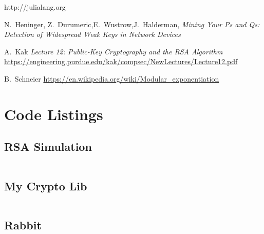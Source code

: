 \documentclass[conference]{/Users/paul/MSEE/ee595/project/report/IEEEtran/IEEEtran}
\begin{document}
%
%
%
\begin{thebibliography}{1}
        http://julialang.org
         
        N.~Heninger, Z.~Durumeric,E.~Wustrow,J.~Halderman, \emph{Mining Your Ps and Qs: Detection of Widespread Weak Keys in Network Devices}

    A.~Kak \emph{Lecture 12: Public-Key Cryptography and the RSA Algorithm}
    \url{https://engineering.purdue.edu/kak/compsec/NewLectures/Lecture12.pdf}
     
        B.~Schneier \url{https://en.wikipedia.org/wiki/Modular_exponentiation}
\end{thebibliography}

\onecolumn
\newpage

\section{Code Listings}
\subsection{RSA Simulation}
\inputminted{julia}{../code/rsa_sim.jl}
 
\subsection{My Crypto Lib}
\inputminted{julia}{../code/my_crypto.jl}
 
\subsection{Rabbit}
\inputminted{julia}{../code/rabbit.jl}
\end{document}
